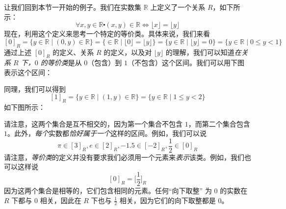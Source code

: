 \begin{example}
    让我们回到本节一开始的例子。我们在实数集 $\mathbb{R}$ 上定义了一个关系 $R$，如下所示：
    \[\forall x, y \in \mathbb{R} \centerdot (x, y) \in \mathbb{R} \iff \lfloor x \rfloor = \lfloor y \rfloor\]
    现在，利用这个定义来思考一个特定的等价类。具体来说，我们来看
    \[[0]_R = \{y \in \mathbb{R} \mid (0, y) \in \mathbb{R}\} = \{\in \mathbb{R} \mid \lfloor 0 \rfloor = \lfloor y \rfloor\} = \{y \in \mathbb{R} \mid \lfloor y \rfloor = 0\} = \{y \in \mathbb{R} \mid 0 \le y < 1\}\]
    通过上述 $[0]_R$ 的定义、关系 $R$ 的定义，以及对 $\lfloor y \rfloor$ 的理解，我们可以知道\emph{在关系 $R$ 下，$0$ 的等价类}是从 $0$（包含）到 $1$（不包含）这个区间。我们可以用下图表示这个区间：

    \begin{center}
        {}
    \end{center}

    同理，我们可以得到
    \[[1]_R = \{y \in \mathbb{R} \mid (1, y) \in \mathbb{R}\} = \{y \in \mathbb{R} \mid 1 \le y < 2\}\]
    如下图所示：

    \begin{center}
        {}
    \end{center}
\end{example}

请注意，这两个集合是互不相交的，因为第一个集合不包含 $1$，而第二个集合包含 $1$。此外，\emph{每个}实数都\emph{恰好属于一个}这样的区间。例如，我们可以说
\[\pi \in [3]_R, e \in [2]_R, -1.5 \in [-2]_R,\frac{1}{2} \in [0]_R\]
请注意，\emph{等价类}的定义并没有要求我们必须用一个元素来\emph{表示}该类。例如，我们也可以这样说
\[[0]_R = \Big[\frac{1}{2}\Big]_R\]
因为这两个集合是相等的，它们包含相同的元素。任何``向下取整'' 为 $0$ 的实数在 $R$ 下都与 $0$ 相关，因此在 $R$ 下也与 $\frac{1}{2}$ 相关，因为它们的向下取整都是 $0$。

